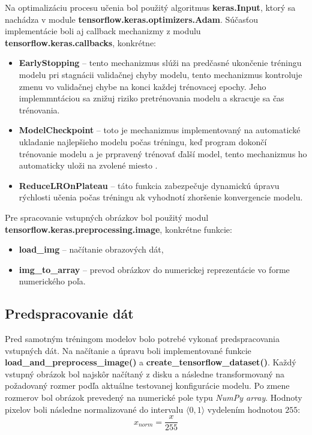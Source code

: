 Na optimalizáciu procesu učenia bol použitý algoritmus \textbf{keras.Input}, ktorý sa nachádza v module \textbf{tensorflow.keras.optimizers.Adam}. Súčasťou implementácie boli aj callback mechanizmy z modulu \textbf{tensorflow.keras.callbacks}, konkrétne:
\begin{itemize}[nolistsep, noitemsep]

    \item \textbf{EarlyStopping} -- tento mechanizmus slúži na predčasné ukončenie tréningu modelu pri stagnácii validačnej chyby modelu, tento mechanizmus kontroluje zmenu vo validačnej chybe na konci každej trénovacej epochy. Jeho implemmntáciou sa znižuj riziko pretrénovania modelu a skracuje sa čas trénovania.  
    
    \item \textbf{ModelCheckpoint} -- toto je mechanizmus implementovaný na automatické ukladanie najlepšieho modelu počas tréningu, keď program dokončí trénovanie modelu a je prpravený trénovať ďalší model, tento mechanizmus ho automaticky uloži na zvolené miesto . 
   
    \item \textbf{ReduceLROnPlateau} -- táto funkcia zabezpečuje dynamickú úpravu rýchlosti učenia počas tréningu ak vyhodnotí zhoršenie konvergencie modelu.
\end{itemize}

Pre spracovanie vstupných obrázkov bol použitý modul \textbf{tensorflow.keras.preprocessing.image}, konkrétne funkcie:
\begin{itemize}[nolistsep, noitemsep]
    \item \textbf{load\_img} -- načítanie obrazových dát,
    
    \item \textbf{img\_to\_array} -- prevod obrázkov do numerickej reprezentácie vo forme numerického poľa.
\end{itemize}


\vspace{\baselineskip}
\subsection{Predspracovanie dát}
Pred samotným tréningom modelov bolo potrebé  vykonať predspracovania vstupných dát. Na načítanie a úpravu boli implementované funkcie \textbf{load\_and\_preprocess\_image()} a \textbf{create\_tensorflow\_dataset()}. Každý vstupný obrázok bol najskôr načítaný z disku a následne transformovaný na požadovaný rozmer podľa aktuálne testovanej konfigurácie modelu. Po zmene rozmerov bol obrázok prevedený na numerické pole typu \textit{NumPy array}. Hodnoty pixelov boli následne normalizované do intervalu $\langle 0,1 \rangle$ vydelením hodnotou $255$:
 \begin{equation*}
x_{norm} = \frac{x}{255}
\end{equation*}

